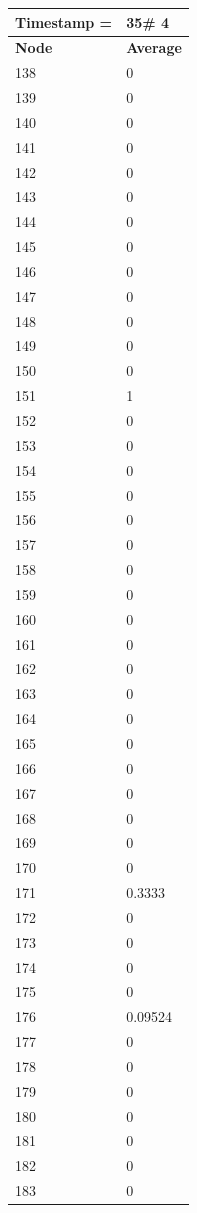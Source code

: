 \begin{tabular}{|l||l|}
\hline
\textbf{Timestamp =} & \textbf{35}\# 4\\\hline
	\textbf{Node} & \textbf{Average} \\ \hline
\hline
	138 & 0 \\ \hline
	139 & 0 \\ \hline
	140 & 0 \\ \hline
	141 & 0 \\ \hline
	142 & 0 \\ \hline
	143 & 0 \\ \hline
	144 & 0 \\ \hline
	145 & 0 \\ \hline
	146 & 0 \\ \hline
	147 & 0 \\ \hline
	148 & 0 \\ \hline
	149 & 0 \\ \hline
	150 & 0 \\ \hline
	151 & 1 \\ \hline
	152 & 0 \\ \hline
	153 & 0 \\ \hline
	154 & 0 \\ \hline
	155 & 0 \\ \hline
	156 & 0 \\ \hline
	157 & 0 \\ \hline
	158 & 0 \\ \hline
	159 & 0 \\ \hline
	160 & 0 \\ \hline
	161 & 0 \\ \hline
	162 & 0 \\ \hline
	163 & 0 \\ \hline
	164 & 0 \\ \hline
	165 & 0 \\ \hline
	166 & 0 \\ \hline
	167 & 0 \\ \hline
	168 & 0 \\ \hline
	169 & 0 \\ \hline
	170 & 0 \\ \hline
	171 & 0.3333 \\ \hline
	172 & 0 \\ \hline
	173 & 0 \\ \hline
	174 & 0 \\ \hline
	175 & 0 \\ \hline
	176 & 0.09524 \\ \hline
	177 & 0 \\ \hline
	178 & 0 \\ \hline
	179 & 0 \\ \hline
	180 & 0 \\ \hline
	181 & 0 \\ \hline
	182 & 0 \\ \hline
	183 & 0 \\ \hline
\end{tabular}
